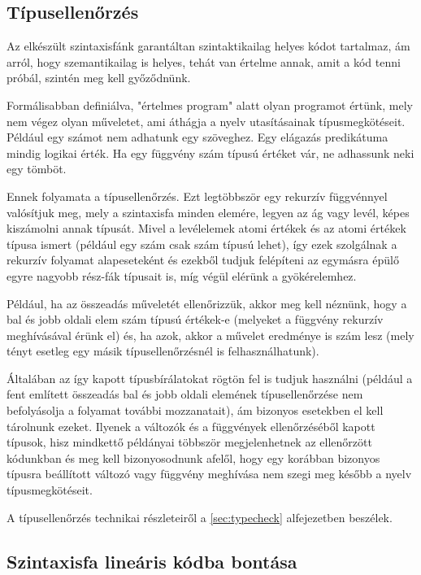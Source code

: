 \subsection{Típusellenőrzés}

Az elkészült szintaxisfánk garantáltan szintaktikailag helyes kódot tartalmaz, ám arról, hogy szemantikailag is helyes, tehát van értelme annak, amit a kód tenni próbál, szintén meg kell győződnünk.

Formálisabban definiálva, "értelmes program" alatt olyan programot értünk, mely nem végez olyan műveletet, ami áthágja a nyelv utasításainak típusmegkötéseit. Például egy számot nem adhatunk egy szöveghez. Egy elágazás predikátuma mindig logikai érték. Ha egy függvény szám típusú értéket vár, ne adhassunk neki egy tömböt.

Ennek folyamata a típusellenőrzés. Ezt legtöbbször egy rekurzív függvénnyel valósítjuk meg, mely a szintaxisfa minden elemére, legyen az ág vagy levél, képes kiszámolni annak típusát. Mivel a levélelemek atomi értékek és az atomi értékek típusa ismert (például egy szám csak szám típusú lehet), így ezek szolgálnak a rekurzív folyamat alapeseteként és ezekből tudjuk felépíteni az egymásra épülő egyre nagyobb rész-fák típusait is, míg végül elérünk a gyökérelemhez.

Például, ha az összeadás műveletét ellenőrizzük, akkor meg kell néznünk, hogy a bal és jobb oldali elem szám típusú értékek-e (melyeket a függvény rekurzív meghívásával érünk el) és, ha azok, akkor a művelet eredménye is szám lesz (mely tényt esetleg egy másik típusellenőrzésnél is felhasználhatunk).

Általában az így kapott típusbírálatokat rögtön fel is tudjuk használni (például a fent említett összeadás bal és jobb oldali elemének típusellenőrzése nem befolyásolja a folyamat további mozzanatait), ám bizonyos esetekben el kell tárolnunk ezeket. Ilyenek a változók és a függvények ellenőrzéséből kapott típusok, hisz mindkettő példányai többször megjelenhetnek az ellenőrzött kódunkban és meg kell bizonyosodnunk afelől, hogy egy korábban bizonyos típusra beállított változó vagy függvény meghívása nem szegi meg később a nyelv típusmegkötéseit.

A típusellenőrzés technikai részleteiről a \ref{sec:typecheck} alfejezetben beszélek.

\subsection{Szintaxisfa lineáris kódba bontása}

